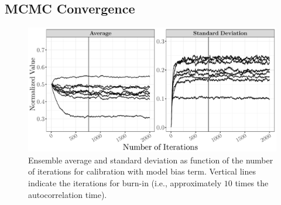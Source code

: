 \subsection{MCMC Convergence}\label{sub:bc_mcmc_convergence}

\begin{figure}[!bth]
    \centering
    \includegraphics[width=1.0\textwidth]{../figures/chapter5/figures/plotEnsStatMCMC}
    \caption[Ensemble average and standard deviation as function of the number of iterations for calibration with model bias term.]{Ensemble average and standard deviation as function of the number of iterations for calibration with model bias term. Vertical lines indicate the iterations for burn-in (i.e., approximately $10$ times the autocorrelation time).}
    \label{fig:ch5_plot_ens_stat_mcmc}
\end{figure}

